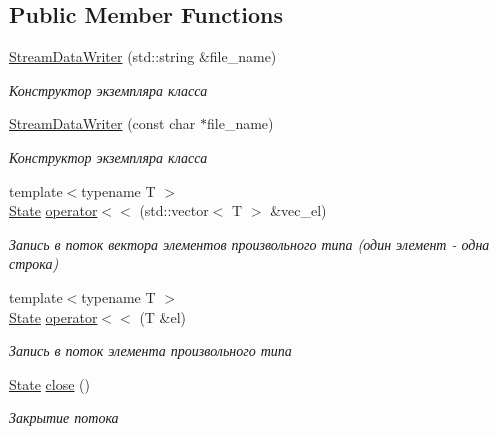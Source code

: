 \subsection*{Public Member Functions}
\begin{DoxyCompactItemize}
\item 
\hyperlink{classtcc_1_1_stream_data_writer_a9f01eb2c6ee3e38a19c805b23b77bb15}{Stream\+Data\+Writer} (std\+::string \&file\+\_\+name)
\begin{DoxyCompactList}\small\item\em Конструктор экземпляра класса \end{DoxyCompactList}\item 
\hyperlink{classtcc_1_1_stream_data_writer_ad59e6b2d6e70d0e33b156e4725ef7840}{Stream\+Data\+Writer} (const char $\ast$file\+\_\+name)
\begin{DoxyCompactList}\small\item\em Конструктор экземпляра класса \end{DoxyCompactList}\item 
{\footnotesize template$<$typename T $>$ }\\\hyperlink{classtcc_1_1_stream_data_writer_a014e8165660b60c024aee93941f283e1}{State} \hyperlink{classtcc_1_1_stream_data_writer_a74d9a0e4c439c26629225e5454184d8f}{operator$<$$<$} (std\+::vector$<$ T $>$ \&vec\+\_\+el)
\begin{DoxyCompactList}\small\item\em Запись в поток вектора элементов произвольного типа (один элемент -\/ одна строка) \end{DoxyCompactList}\item 
{\footnotesize template$<$typename T $>$ }\\\hyperlink{classtcc_1_1_stream_data_writer_a014e8165660b60c024aee93941f283e1}{State} \hyperlink{classtcc_1_1_stream_data_writer_a89ddb0f6d7df65db9d93af63c7de4ea1}{operator$<$$<$} (T \&el)
\begin{DoxyCompactList}\small\item\em Запись в поток элемента произвольного типа \end{DoxyCompactList}\item 
\hyperlink{classtcc_1_1_stream_data_writer_a014e8165660b60c024aee93941f283e1}{State} \hyperlink{classtcc_1_1_stream_data_writer_afb23b2dba09ad43c68f7e313853191e2}{close} ()\hypertarget{classtcc_1_1_stream_data_writer_afb23b2dba09ad43c68f7e313853191e2}{}\label{classtcc_1_1_stream_data_writer_afb23b2dba09ad43c68f7e313853191e2}

\begin{DoxyCompactList}\small\item\em Закрытие потока \end{DoxyCompactList}\end{DoxyCompactItemize}
